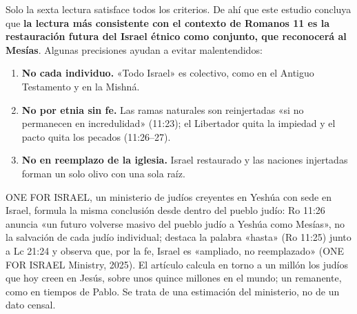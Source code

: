 \documentclass[11pt,letterpaper]{article}
\newcommand{\destacar}[1]{\textbf{\textcolor{ladrillo}{#1}}}
\begin{document}
Solo la sexta lectura satisface todos los criterios. De ahí que este estudio concluya que \destacar{la lectura más consistente con el contexto de Romanos 11 es la restauración futura del Israel étnico como conjunto, que reconocerá al Mesías}. Algunas precisiones ayudan a evitar malentendidos:
\begin{enumerate}
\item \textbf{No cada individuo.} «Todo Israel» es colectivo, como en el Antiguo Testamento y en la Mishná.
\item \textbf{No por etnia sin fe.} Las ramas naturales son reinjertadas «si no permanecen en incredulidad» (11:23); el Libertador quita la impiedad y el pacto quita los pecados (11:26--27).
\item \textbf{No en reemplazo de la iglesia.} Israel restaurado y las naciones injertadas forman un solo olivo con una sola raíz.
\end{enumerate}

ONE FOR ISRAEL, un ministerio de judíos creyentes en Yeshúa con sede en Israel, formula la misma conclusión desde dentro del pueblo judío: Ro 11:26 anuncia «un futuro volverse masivo del pueblo judío a Yeshúa como Mesías», no la salvación de cada judío individual; destaca la palabra «hasta» (Ro 11:25) junto a Lc 21:24 y observa que, por la fe, Israel es «ampliado, no reemplazado» (ONE FOR ISRAEL Ministry, 2025). El artículo calcula en torno a un millón los judíos que hoy creen en Jesús, sobre unos quince millones en el mundo; un remanente, como en tiempos de Pablo. Se trata de una estimación del ministerio, no de un dato censal.
\end{document}
